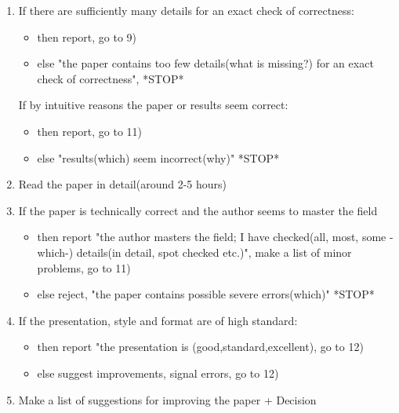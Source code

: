 \documentclass[]{article}
\begin{document}
\begin{enumerate}
\item If there are sufficiently many details for an exact check of correctness:

\begin{itemize}
\item then report, go to 9)
\item else "the paper contains too few details(what is missing?) for an exact check of correctness", *STOP*
\end{itemize}

If by intuitive reasons the paper or results seem correct:

\begin{itemize}
\item then report, go to 11)
\item else "results(which) seem incorrect(why)" *STOP*
\end{itemize}

	
\item Read the paper in detail(around 2-5 hours)

\item If the paper is technically correct and the author seems to master the field
\begin{itemize}
\item then report "the author masters the field; I have checked(all, most, some -which-) details(in detail, spot checked etc.)", make a list of minor problems, go to 11)
\item else reject, "the paper contains possible severe errors(which)" *STOP*
\end{itemize}

\item If the presentation, style and format are of high standard:
\begin{itemize}
\item then report "the presentation is (good,standard,excellent), go to 12)
\item else suggest improvements, signal errors, go to 12)
\end{itemize}

\item Make a list of suggestions for improving the paper + Decision
\end{enumerate}
\end{document}
